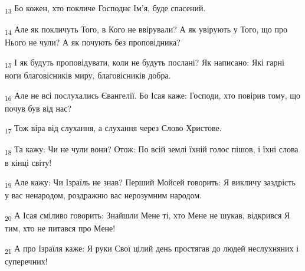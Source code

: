 \begin{tcolorbox}
\textsubscript{13} Бо кожен, хто покличе Господнє Ім'я, буде спасений.
\end{tcolorbox}
\begin{tcolorbox}
\textsubscript{14} Але як покличуть Того, в Кого не ввірували? А як увірують у Того, що про Нього не чули? А як почують без проповідника?
\end{tcolorbox}
\begin{tcolorbox}
\textsubscript{15} І як будуть проповідувати, коли не будуть послані? Як написано: Які гарні ноги благовісників миру, благовісників добра.
\end{tcolorbox}
\begin{tcolorbox}
\textsubscript{16} Але не всі послухались Євангелії. Бо Ісая каже: Господи, хто повірив тому, що почув був від нас?
\end{tcolorbox}
\begin{tcolorbox}
\textsubscript{17} Тож віра від слухання, а слухання через Слово Христове.
\end{tcolorbox}
\begin{tcolorbox}
\textsubscript{18} Та кажу: Чи не чули вони? Отож: По всій землі їхній голос пішов, і їхні слова в кінці світу!
\end{tcolorbox}
\begin{tcolorbox}
\textsubscript{19} Але кажу: Чи Ізраїль не знав? Перший Мойсей говорить: Я викличу заздрість у вас ненародом, роздражню вас нерозумним народом.
\end{tcolorbox}
\begin{tcolorbox}
\textsubscript{20} А Ісая сміливо говорить: Знайшли Мене ті, хто Мене не шукав, відкрився Я тим, хто не питався про Мене!
\end{tcolorbox}
\begin{tcolorbox}
\textsubscript{21} А про Ізраїля каже: Я руки Свої цілий день простягав до людей неслухняних і суперечних!
\end{tcolorbox}
